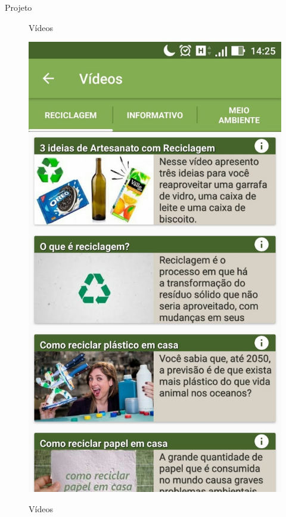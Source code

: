 \documentclass[
	12pt,				%
	openright,			%
	twoside,			%
	a4paper,			%
	english,			%
	french,				%
	spanish,			%
	brazil				%
	]{abntex2}
\begin{document}
\begin{chapter}{Projeto}
    \begin{figure}[htb]    
 \centering
  \begin{minipage}{0.45\textwidth}
    \centering
    \caption{Vídeos}
    \includegraphics[scale=0.35]{media/tela_videos_1.jpg}
     \label{fig:tela_videos_1}
  \end{minipage}
  \hfill
  \begin{minipage}{0.45\textwidth}
    \centering
    \caption{Vídeos}

\end{minipage}
\end{figure}
\end{chapter}
\end{document}
